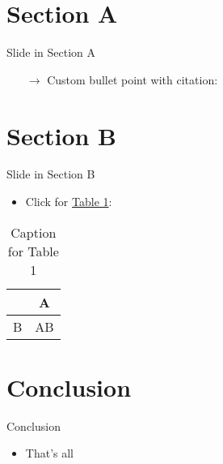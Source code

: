 \documentclass[aspectratio = 1610, english, 11pt]{beamer}
\begin{document}
  \section{Section A}
  \begin{frame}{Slide in Section A}
    \begin{itemize}
      \vspace{2mm}
      \begin{itemize}
        \vspace{2mm}
        \begin{itemize}
        \end{itemize}
      \end{itemize}
      \vspace{3mm}
      \item[$\rightarrow$] Custom bullet point with citation: \alert{\citet{mycitation}}
    \end{itemize}
  \end{frame}

  \section{Section B}
  \begin{frame}{Slide in Section B}
    \begin{itemize}
      \item Click for \alert{\hyperlink{tab:1}{Table 1}}:
    \end{itemize}
    \vspace{1mm}
    \begin{table}
      \centering
      \begin{tabular}{l|c}
        & A\\
        \hline
        B & AB\\
      \end{tabular}
      \caption{Caption for Table 1}
      \label{tab:1}
    \end{table}
  \end{frame}

  \section{Conclusion}
  \begin{frame}{Conclusion}
    \begin{itemize}
      \item That's all
    \end{itemize}
  \end{frame}
\end{document}
